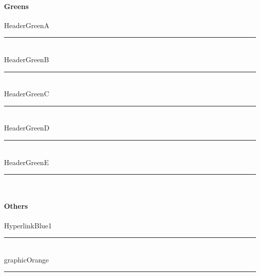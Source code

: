 \paragraph[Geens]{Greens\texorpdfstring{\\}{}}
\textcolor{HeaderGreenA}{HeaderGreenA}
\noindent\textcolor{HeaderGreenA}{\rule{.5\textwidth}{.5mm}}\\
\textcolor{HeaderGreenB}{HeaderGreenB}
\noindent\textcolor{HeaderGreenB}{\rule{.5\textwidth}{.5mm}}\\
\textcolor{HeaderGreenC}{HeaderGreenC}
\noindent\textcolor{HeaderGreenC}{\rule{.5\textwidth}{.5mm}}\\
\textcolor{HeaderGreenD}{HeaderGreenD}
\noindent\textcolor{HeaderGreenD}{\rule{.5\textwidth}{.5mm}}\\
\textcolor{HeaderGreenE}{HeaderGreenE}
\noindent\textcolor{HeaderGreenE}{\rule{.5\textwidth}{.5mm}}\\
\paragraph[Others]{Others\texorpdfstring{\\}{}}
\textcolor{HyperlinkBlue1}{HyperlinkBlue1}
\noindent\textcolor{HyperlinkBlue1}{\rule{.5\textwidth}{.5mm}}\\
\textcolor{graphicOrange}{graphicOrange}
\noindent\textcolor{graphicOrange}{\rule{.5\textwidth}{.5mm}}\\
\clearpage

